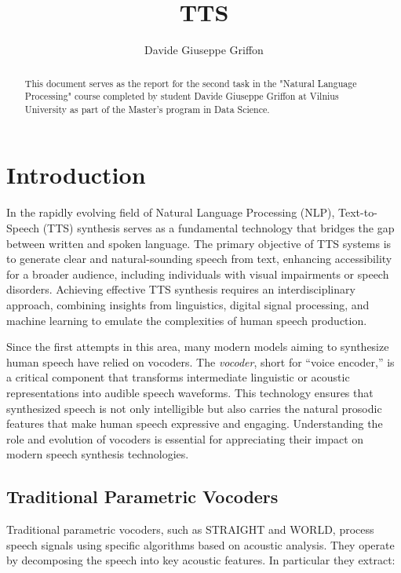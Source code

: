 \documentclass[12pt]{article}
\title{TTS}
\author{Davide Giuseppe Griffon}
\date{}
\begin{document}
\maketitle

\begin{abstract}
    This document serves as the report for the second task in the "Natural Language Processing" course completed by student Davide Giuseppe Griffon at Vilnius University as part of the Master's program in Data Science.
\end{abstract}

\tableofcontents

\newpage

\section{Introduction}

In the rapidly evolving field of Natural Language Processing (NLP), Text-to-Speech (TTS) synthesis serves as a fundamental technology that bridges the gap between written and spoken language. The primary objective of TTS systems is to generate clear and natural-sounding speech from text, enhancing accessibility for a broader audience, including individuals with visual impairments or speech disorders. Achieving effective TTS synthesis requires an interdisciplinary approach, combining insights from linguistics, digital signal processing, and machine learning to emulate the complexities of human speech production.

Since the first attempts in this area, many modern models aiming to synthesize human speech have relied on vocoders. The \textit{vocoder}, short for ``voice encoder,'' is a critical component that transforms intermediate linguistic or acoustic representations into audible speech waveforms. This technology ensures that synthesized speech is not only intelligible but also carries the natural prosodic features that make human speech expressive and engaging. Understanding the role and evolution of vocoders is essential for appreciating their impact on modern speech synthesis technologies.

\subsection{Traditional Parametric Vocoders}

Traditional parametric vocoders, such as STRAIGHT and WORLD, process speech signals using specific algorithms based on acoustic analysis. They operate by decomposing the speech into key acoustic features. In particular they extract:
\end{document}
